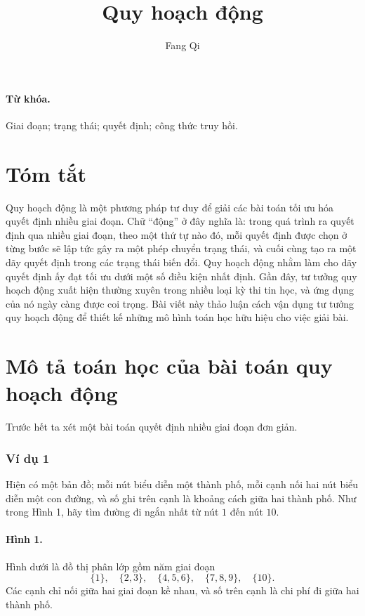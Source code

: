 \documentclass[11pt]{article}
\title{Quy hoạch động}
\author{Fang Qi}
\date{}
\begin{document}
\maketitle


\paragraph{Từ khóa.}
Giai đoạn; trạng thái; quyết định; công thức truy hồi.

\section*{Tóm tắt}

Quy hoạch động là một phương pháp tư duy để giải các bài toán tối ưu hóa
quyết định nhiều giai đoạn. Chữ ``động'' ở đây nghĩa là: trong quá trình ra
quyết định qua nhiều giai đoạn, theo một thứ tự nào đó, mỗi quyết định được
chọn ở từng bước sẽ lập tức gây ra một phép chuyển trạng thái, và cuối cùng
tạo ra một dãy quyết định trong các trạng thái biến đổi. Quy hoạch động nhằm
làm cho dãy quyết định ấy đạt tối ưu dưới một số điều kiện nhất định. Gần đây,
tư tưởng quy hoạch động xuất hiện thường xuyên trong nhiều loại kỳ thi tin
học, và ứng dụng của nó ngày càng được coi trọng. Bài viết này thảo luận cách
vận dụng tư tưởng quy hoạch động để thiết kế những mô hình toán học hữu hiệu
cho việc giải bài.

\section{Mô tả toán học của bài toán quy hoạch động}

Trước hết ta xét một bài toán quyết định nhiều giai đoạn đơn giản.

\subsubsection*{Ví dụ 1}

Hiện có một bản đồ; mỗi nút biểu diễn một thành phố, mỗi cạnh nối hai nút biểu
diễn một con đường, và số ghi trên cạnh là khoảng cách giữa hai thành phố. Như
trong Hình 1, hãy tìm đường đi ngắn nhất từ nút $1$ đến nút $10$.

\paragraph{Hình 1.}
Hình dưới là đồ thị phân lớp gồm năm giai đoạn
\[
  \{1\},\quad \{2,3\},\quad \{4,5,6\},\quad \{7,8,9\},\quad \{10\}.
\]
Các cạnh chỉ nối giữa hai giai đoạn kề nhau, và số trên cạnh là chi phí đi
giữa hai thành phố.
\end{document}
